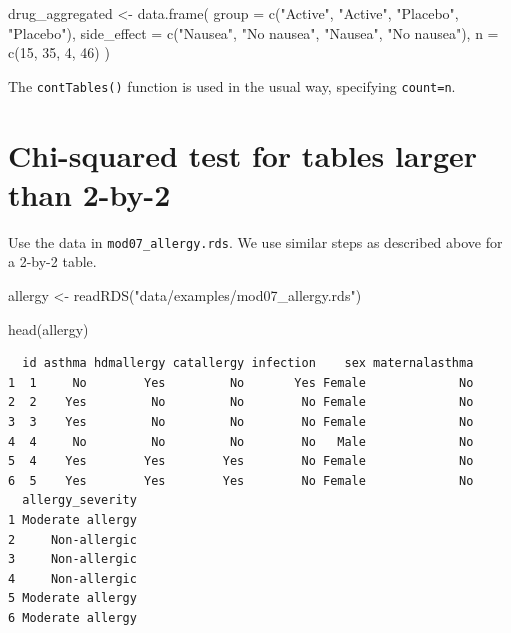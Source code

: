 \documentclass[
  a4paper,
]{memoir}
\newenvironment{Shaded}{\begin{snugshade}}{\end{snugshade}}
\newcommand{\AttributeTok}[1]{\textcolor[rgb]{0.00,0.00,0.00}{#1}}
\newcommand{\DecValTok}[1]{\textcolor[rgb]{0.00,0.00,0.00}{#1}}
\newcommand{\FunctionTok}[1]{\textcolor[rgb]{0.00,0.00,0.00}{#1}}
\newcommand{\NormalTok}[1]{\textcolor[rgb]{0.00,0.00,0.00}{#1}}
\newcommand{\OtherTok}[1]{\textcolor[rgb]{0.00,0.00,0.00}{#1}}
\newcommand{\StringTok}[1]{\textcolor[rgb]{0.00,0.00,0.00}{#1}}
\begin{document}
\begin{Shaded}
\begin{Highlighting}[]
\NormalTok{drug\_aggregated }\OtherTok{\textless{}{-}} \FunctionTok{data.frame}\NormalTok{(}
    \AttributeTok{group =} \FunctionTok{c}\NormalTok{(}\StringTok{"Active"}\NormalTok{, }\StringTok{"Active"}\NormalTok{, }\StringTok{"Placebo"}\NormalTok{, }\StringTok{"Placebo"}\NormalTok{),}
    \AttributeTok{side\_effect =} \FunctionTok{c}\NormalTok{(}\StringTok{"Nausea"}\NormalTok{, }\StringTok{"No nausea"}\NormalTok{, }\StringTok{"Nausea"}\NormalTok{, }\StringTok{"No nausea"}\NormalTok{),}
    \AttributeTok{n =} \FunctionTok{c}\NormalTok{(}\DecValTok{15}\NormalTok{, }\DecValTok{35}\NormalTok{, }\DecValTok{4}\NormalTok{, }\DecValTok{46}\NormalTok{)}
\NormalTok{)}
\end{Highlighting}
\end{Shaded}

The \texttt{contTables()} function is used in the usual way, specifying
\texttt{count=n}.

\section{Chi-squared test for tables larger than
2-by-2}\label{chi-squared-test-for-tables-larger-than-2-by-2-1}

Use the data in \texttt{mod07\_allergy.rds}. We use similar steps as
described above for a 2-by-2 table.

\begin{Shaded}
\begin{Highlighting}[]
\NormalTok{allergy }\OtherTok{\textless{}{-}} \FunctionTok{readRDS}\NormalTok{(}\StringTok{"data/examples/mod07\_allergy.rds"}\NormalTok{)}

\FunctionTok{head}\NormalTok{(allergy)}
\end{Highlighting}
\end{Shaded}

\begin{verbatim}
  id asthma hdmallergy catallergy infection    sex maternalasthma
1  1     No        Yes         No       Yes Female             No
2  2    Yes         No         No        No Female             No
3  3    Yes         No         No        No Female             No
4  4     No         No         No        No   Male             No
5  4    Yes        Yes        Yes        No Female             No
6  5    Yes        Yes        Yes        No Female             No
  allergy_severity
1 Moderate allergy
2     Non-allergic
3     Non-allergic
4     Non-allergic
5 Moderate allergy
6 Moderate allergy
\end{verbatim}
\end{document}
